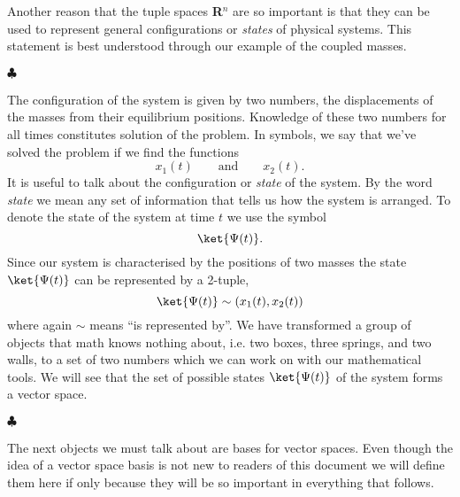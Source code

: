 Another reason that the tuple spaces \textbf{R}$^{n}$ are so important is that they can be used to represent general configurations or \textit{states} of physical systems.
This statement is best understood through our example of the coupled masses.

\begin{flushleft} $\clubsuit$ \end{flushleft}
The configuration of the system is given by two numbers, the displacements of the masses from their equilibrium positions.
Knowledge of these two numbers for all times constitutes solution of the problem.
In symbols, we say that we've solved the problem if we find the functions
\begin{equation}
x_{1}(t) \qquad \textrm{and} \qquad x_{2}(t).
\end{equation}
It is useful to talk about the configuration or \textit{state} of the system.
By the word \textit{state} we mean any set of information that tells us how the system is arranged.
To denote the state of the system at time $t$ we use the symbol
\begin{displaymath}
\ket{\Psi (t)}.
\end{displaymath}
Since our system is characterised by the positions of two masses the state $\ket{\Psi (t)}$ can be represented by a 2-tuple,
\begin{equation} \label{eq:Psirep}
\ket{\Psi (t)} \sim (x_{1}(t),x_2(t))
\end{equation}
where again $\sim$ means ``is represented by''.
We have transformed a group of objects that math knows nothing about, i.e. two boxes, three springs, and two walls, to a set of two numbers which we can work on with our mathematical tools.
We will see that the set of possible states $\ket{\Psi (t)}$ of the system forms a vector space.\begin{flushright} $\clubsuit$ \end{flushright}


The next objects we must talk about are bases for vector spaces.
Even though the idea of a vector space basis is not new to readers of this document we will define them here if only because they will be so important in everything that follows.

